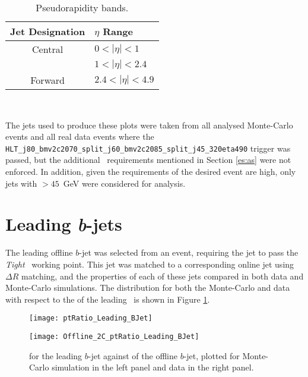 	\begin{table}[h]
		\caption[Pseudorapidity bands of the object performance analysis]{Pseudorapidity bands.}
		\label{tab:etabands}
		\medskip
		\centering
		\begin{tabular}{cl}\toprule
			Jet Designation & $\eta$ Range \\\midrule
			Central & $0<|\eta|<1$ \\
			 & $1<|\eta|<2.4$  \\
			Forward & $2.4<|\eta|<4.9$ \\\bottomrule
		\end{tabular}\\[5pt]
	\end{table}

	The jets used to produce these plots were taken from all analysed Monte-Carlo events and all real data events where the \texttt{HLT\_j80\_bmv2c2070\_split\_\-j60\_bmv2c2085\_split\_j45\_320eta490} trigger was passed, but the additional \VBFHBB\, requirements mentioned in Section \ref{es:as} were not enforced. In addition, given the \pt requirements of the desired event are high, only jets with \pt$>45$~GeV were considered for analysis.

\section{Leading \textit{b}-jets}
\label{OP:leadingb}

	The leading \pt offline $b$-jet was selected from an event, requiring the jet to pass the \textit{Tight} \btagging\ working point. This jet was matched to a corresponding online jet using $\Delta R$ matching, and the properties of each of these jets compared in both data and Monte-Carlo simulations. The \dptpt distribution for both the Monte-Carlo and data with respect to the \pt of the leading \bjet\ is shown in Figure \ref{fig:O:leadingbpt}.

		\begin{figure}[h]
			\centering
			\begin{minipage}[h]{0.48\linewidth}
				\texttt{[image: ptRatio\_Leading\_BJet]}

			\end{minipage}
			\quad
			\begin{minipage}[h]{0.48\linewidth}
				\texttt{[image: Offline\_2C\_ptRatio\_Leading\_BJet]}
			\end{minipage}
			\caption[\dptpt for the leading $b$-jet in data and Monte-Carlo simulations]{\dptpt for the leading \pt $b$-jet against \pt of the offline $b$-jet, plotted for Monte-Carlo simulation in the left panel and data in the right panel.}
			\label{fig:O:leadingbpt}
		\end{figure}

